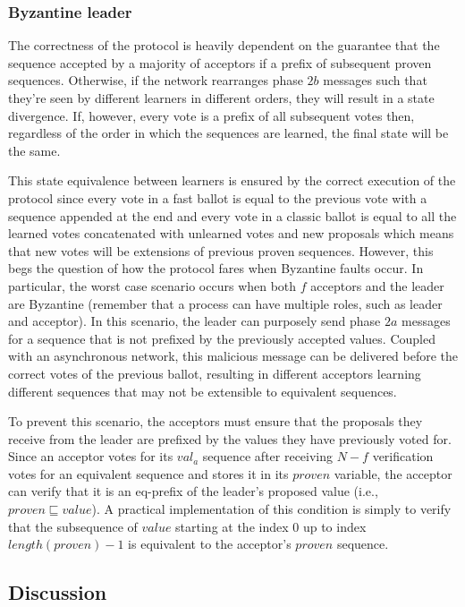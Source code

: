 \subsubsection{Byzantine leader}
The correctness of the protocol is heavily dependent on the guarantee that the sequence accepted by a majority of acceptors if a prefix of subsequent proven sequences. Otherwise, if the network rearranges phase $2b$ messages such that they're seen by different learners in different orders, they will result in a state divergence. If, however, every vote is a prefix of all subsequent votes then, regardless of the order in which the sequences are learned, the final state will be the same. \par 
This state equivalence between learners is ensured by the correct execution of the protocol since every vote in a fast ballot is equal to the previous vote with a sequence appended at the end and every vote in a classic ballot is equal to all the learned votes concatenated with unlearned votes and new proposals which means that new votes will be extensions of previous proven sequences. However, this begs the question of how the protocol fares when Byzantine faults occur. In particular, the worst case scenario occurs when both $f$ acceptors and the leader are Byzantine (remember that a process can have multiple roles, such as leader and acceptor). In this scenario, the leader can purposely send phase $2a$ messages for a sequence that is not prefixed by the previously accepted values. Coupled with an asynchronous network, this malicious message can be delivered before the correct votes of the previous ballot, resulting in different acceptors learning different sequences that may not be extensible to equivalent sequences. \par
To prevent this scenario, the acceptors must ensure that the proposals they receive from the leader are prefixed by the values they have previously voted for. Since an acceptor votes for its $val_a$ sequence after receiving $N-f$ verification votes for an equivalent sequence and stores it in its $proven$ variable, the acceptor can verify that it is an eq-prefix of the leader's proposed value (i.e., $proven \sqsubseteq value$). A practical implementation of this condition is simply to verify that the  subsequence of $value$ starting at the index $0$ up to index $length(proven)-1$ is equivalent to the acceptor's $proven$ sequence. 

\subsection{Discussion}
